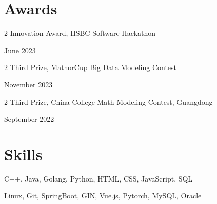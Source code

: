 \documentclass[10pt, letterpaper]{article}
\newenvironment{twocolentry}[2][]{
    \onecolentry
    \def\secondColumn{#2}
    \setcolumnwidth{\fill, 4.5 cm}
    \begin{paracol}{2}
}{
    \switchcolumn \raggedleft \secondColumn
    \end{paracol}
    \endonecolentry
} %
\begin{document}


        
\section{Awards}
\begin{twocolentry}
    {June 2023}{Innovation Award, HSBC Software Hackathon}
\end{twocolentry}
\begin{twocolentry}
    {November 2023}{
    Third Prize, MathorCup Big Data Modeling Contest
    }
\end{twocolentry} 
\begin{twocolentry}
    {September 2022}{Third Prize, China College Math Modeling Contest, Guangdong}
\end{twocolentry}
 
\section{Skills}

\begin{description}
\setlength{\itemsep}{-5pt}   %
    \item[Programming Languages:] C++, Java, Golang, Python, HTML, CSS, JavaScript, SQL
    \item[Technologies:] Linux, Git, SpringBoot, GIN, Vue.js, Pytorch, MySQL, Oracle
\end{description}


    
   

    
    


    
\end{document}
